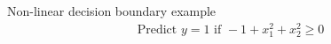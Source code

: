 \documentclass[serif, aspectratio=169]{beamer}
\begin{document}
\begin{frame}{Non-linear decision boundary example}
    \begin{align*}
        \text{Predict } y=1 \text{ if } -1 + x_1^2 + x_2^2 \geq 0
    \end{align*}
    
\end{frame}



\end{document}
